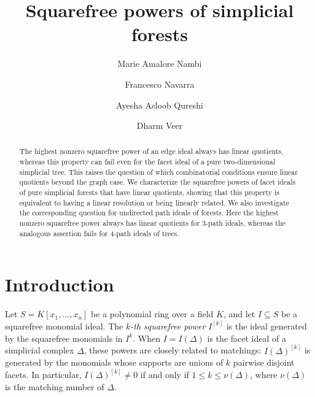 \documentclass{amsart}
\theoremstyle{definition}
\theoremstyle{remark}
\begin{document}
\title[Squarefree powers of simplicial forests]{Squarefree powers of simplicial forests}

\author[M. Amalore Nambi]{Marie Amalore Nambi}
\address{Sabanci University, Faculty of Engineering and Natural Sciences, Orta Mahalle, Tuzla 34956, Istanbul, Turkey}

\author[F. Navarra]{Francesco Navarra}
\address{Sabanci University, Faculty of Engineering and Natural Sciences, Orta Mahalle, Tuzla 34956, Istanbul, Turkey}

\author[A. A. Qureshi]{Ayesha Asloob Qureshi}
\address{Sabanci University, Faculty of Engineering and Natural Sciences, Orta Mahalle, Tuzla 34956, Istanbul, Turkey}

\author[D. Veer]{Dharm Veer}
\address{Department of Mathematics, Purdue University, 150 N. University Street, West Lafayette, IN 47907-2067, USA}



\begin{abstract}

The highest nonzero squarefree power of an edge ideal
always has linear quotients, whereas this property
can fail even for the facet ideal of a pure
two-dimensional simplicial tree. This raises the question of which combinatorial conditions ensure linear quotients beyond the graph case. We characterize the squarefree powers of facet ideals of pure simplicial forests that have linear quotients, showing that this property is equivalent to having a linear resolution or being linearly related. We also investigate the corresponding question for undirected path ideals of forests. Here the highest nonzero squarefree power always has linear quotients for \(3\)-path ideals, whereas the analogous assertion fails for \(4\)-path ideals of trees.
\end{abstract}
\maketitle

\section{Introduction}
Let $S=K[x_1,\ldots,x_n]$ be a polynomial ring over a field $K$, and
let $I\subseteq S$ be a squarefree monomial ideal. The
{\em $k$-th squarefree power} $I^{[k]}$ is the ideal generated by the
squarefree monomials in $I^k$. When $I=I(\Delta)$ is the facet ideal
of a simplicial complex $\Delta$, these powers are closely related
to matchings: $I(\Delta)^{[k]}$ is generated by the monomials whose
supports are unions of $k$ pairwise disjoint facets. In particular,
$I(\Delta)^{[k]}\ne0$ if and only if $1\leq k\leq\nu(\Delta)$,
where $\nu(\Delta)$ is the matching number of $\Delta$. 
\end{document}
